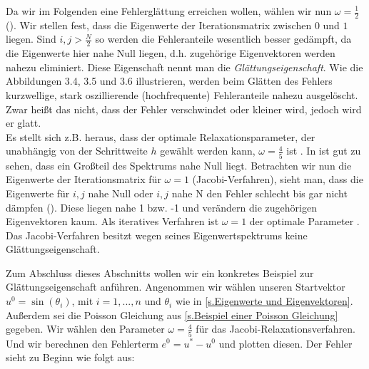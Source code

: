 Da wir im Folgenden eine Fehlerglättung erreichen wollen, wählen wir nun $\omega = \frac {1} {2}$ (). Wir stellen fest, dass die Eigenwerte der Iterationsmatrix zwischen $0$ und $1$ liegen. Sind $i,j > \frac {N} {2}$ so werden die Fehleranteile wesentlich besser gedämpft, da die Eigenwerte hier nahe Null liegen, d.h. zugehörige Eigenvektoren werden nahezu eliminiert. Diese Eigenschaft nennt man die \textit{Glättungseigenschaft}. Wie die Abbildungen 3.4, 3.5 und 3.6 illustrieren, werden beim Glätten des Fehlers kurzwellige, stark oszillierende (hochfrequente) Fehleranteile nahezu ausgelöscht. Zwar heißt das nicht, dass der Fehler verschwindet oder kleiner wird, jedoch wird er glatt.\\
Es stellt sich z.B. heraus, dass der optimale Relaxationsparameter, der unabhängig von der Schrittweite $h$ gewählt werden kann, $\omega = \frac {4} {5}$ ist \cite{SAAD4}. In  ist gut zu sehen, dass ein Großteil des Spektrums nahe Null liegt.
Betrachten wir nun die Eigenwerte der Iterationsmatrix für $\omega = 1$ (Jacobi-Verfahren), sieht man, dass die Eigenwerte für $i,j$ nahe Null oder $i,j$ nahe N den Fehler schlecht bis gar nicht dämpfen (). Diese liegen nahe 1 bzw. -1 und verändern die zugehörigen Eigenvektoren kaum. Als iteratives Verfahren ist $\omega = 1$ der optimale Parameter \cite{SAAD3}. Das Jacobi-Verfahren besitzt wegen seines Eigenwertspektrums keine Glättungseigenschaft.\\

\label{img.Jacobi3}

Zum Abschluss dieses Abschnitts wollen wir ein konkretes Beispiel zur Glättungseigenschaft anführen. Angenommen wir wählen unseren Startvektor $u^{0} = \sin(\theta_{i})$, mit $i = 1,...,n$ und $\theta_{i}$ wie in \autoref{s.Eigenwerte und Eigenvektoren}. Außerdem sei die Poisson Gleichung aus \autoref{s.Beispiel einer Poisson Gleichung} gegeben. Wir wählen den Parameter $\omega = \frac{4}{5}$ für das Jacobi-Relaxationsverfahren. Und wir berechnen den Fehlerterm $e^{0} = u^{*} - u^{0}$ und plotten diesen. Der Fehler sieht zu Beginn wie folgt aus:

